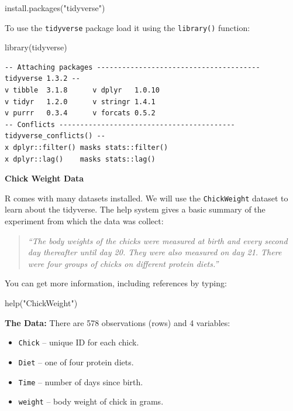 \documentclass[
  letterpaper,
  DIV=11,
  numbers=noendperiod]{scrreprt}
\newenvironment{Shaded}{\begin{snugshade}}{\end{snugshade}}
\newcommand{\FunctionTok}[1]{\textcolor[rgb]{0.28,0.35,0.67}{#1}}
\newcommand{\NormalTok}[1]{\textcolor[rgb]{0.00,0.23,0.31}{#1}}
\newcommand{\StringTok}[1]{\textcolor[rgb]{0.13,0.47,0.30}{#1}}
\providecommand{\tightlist}{%
  \setlength{\itemsep}{0pt}\setlength{\parskip}{0pt}}\usepackage{longtable,booktabs,array}
\theoremstyle{definition}
\theoremstyle{plain}
\theoremstyle{plain}
\theoremstyle{remark}
\begin{document}
\begin{Shaded}
\begin{Highlighting}[]
\FunctionTok{install.packages}\NormalTok{(}\StringTok{"tidyverse"}\NormalTok{)}
\end{Highlighting}
\end{Shaded}

To use the \texttt{tidyverse} package load it using the
\texttt{library()} function:

\begin{Shaded}
\begin{Highlighting}[]
\FunctionTok{library}\NormalTok{(tidyverse)}
\end{Highlighting}
\end{Shaded}

\begin{verbatim}
-- Attaching packages --------------------------------------- tidyverse 1.3.2 --
v tibble  3.1.8      v dplyr   1.0.10
v tidyr   1.2.0      v stringr 1.4.1 
v purrr   0.3.4      v forcats 0.5.2 
-- Conflicts ------------------------------------------ tidyverse_conflicts() --
x dplyr::filter() masks stats::filter()
x dplyr::lag()    masks stats::lag()
\end{verbatim}

\textbf{Chick Weight Data}

R comes with many datasets installed. We will use the
\texttt{ChickWeight} dataset to learn about the tidyverse. The help
system gives a basic summary of the experiment from which the data was
collect:

\begin{quote}
\emph{``The body weights of the chicks were measured at birth and every
second day thereafter until day 20. They were also measured on day 21.
There were four groups of chicks on different protein diets.''}
\end{quote}

You can get more information, including references by typing:

\begin{Shaded}
\begin{Highlighting}[]
\FunctionTok{help}\NormalTok{(}\StringTok{"ChickWeight"}\NormalTok{)}
\end{Highlighting}
\end{Shaded}

\textbf{The Data: } There are 578 observations (rows) and 4 variables:

\begin{itemize}
\tightlist
\item
  \texttt{Chick} -- unique ID for each chick.
\item
  \texttt{Diet} -- one of four protein diets.
\item
  \texttt{Time} -- number of days since birth.
\item
  \texttt{weight} -- body weight of chick in grams.
\end{itemize}
\end{document}
